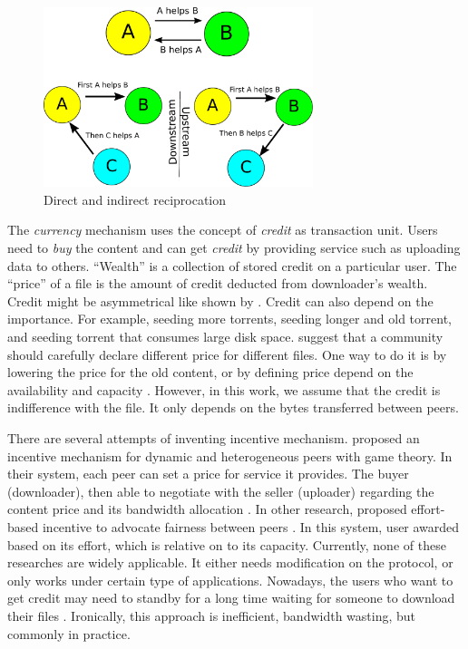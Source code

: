 \begin{figure}[t]
	\centering
	\includegraphics[width=0.7\textwidth]{pics/reciprocation.pdf}
	\caption{Direct and indirect reciprocation}
	\label{fig:reciprocation}
\end{figure}

The \textit{currency} mechanism uses the concept of \textit{credit} as transaction unit. Users need to \textit{buy} the content and can get \textit{credit} by providing service such as uploading data to others. ``Wealth'' is a collection of stored credit on a particular user. The ``price'' of a file is the amount of credit deducted from downloader's wealth. Credit might be asymmetrical like shown by \citeauthor{2012:economicbt:kash}\cite{2012:economicbt:kash}. Credit can also depend on the importance. For example, seeding more torrents, seeding longer and old torrent, and seeding torrent that consumes large disk space\cite{2014:sustainabilitytorrent:chen}. \citeauthor{2012:economicbt:kash} suggest that a community should carefully declare different price for different files. One way to do it is by lowering the price for the old content, or by defining price depend on the availability and capacity \cite{2012:economicbt:kash}. However, in this work, we assume that the credit is indifference with the file. It only depends on the bytes transferred between peers.

There are several attempts of inventing incentive mechanism. \citeauthor{2015:incentivep2pgame:kang} proposed an incentive mechanism for dynamic and heterogeneous peers with game theory. In their system, each peer can set a price for service it provides. The buyer (downloader), then able to negotiate with the seller (uploader) regarding the content price and its bandwidth allocation \cite{2015:incentivep2pgame:kang}. In other research, \citeauthor{2010:effortincentive:rahman} proposed effort-based incentive to advocate fairness between peers \cite{2010:effortincentive:rahman}. In this system, user awarded based on its effort, which is relative on to its capacity. Currently, none of these researches are widely applicable. It either needs modification on the protocol, or only works under certain type of applications. Nowadays, the users who want to get credit may need to standby for a long time waiting for someone to download their files \cite{2013:survivepriv:jia}. Ironically, this approach is inefficient, bandwidth wasting, but commonly in practice\cite{2013:survivepriv:jia}.


